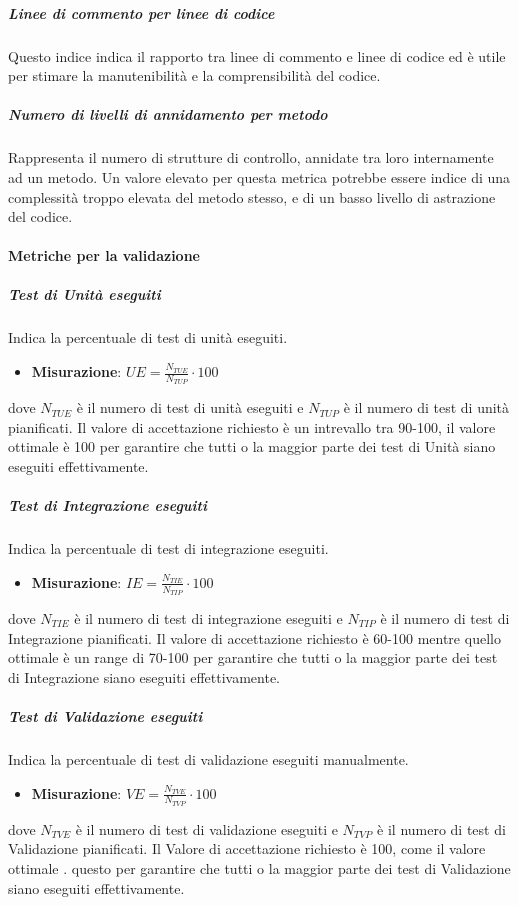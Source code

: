 \subparagraph{Linee di commento per linee di codice}
Questo indice indica il rapporto tra linee di commento e linee di codice ed è utile per stimare la manutenibilità e la comprensibilità del codice. 

\subparagraph{Numero di livelli di annidamento per metodo}
Rappresenta il numero di strutture di controllo, annidate tra loro internamente ad un metodo.
Un valore elevato per questa metrica potrebbe essere indice di una complessità troppo elevata del metodo stesso, e di un basso livello di astrazione del codice.



\paragraph{Metriche per la validazione}


\subparagraph{Test di Unità eseguiti}
Indica la percentuale di test di unità eseguiti.
\begin{itemize}
\item \textbf{Misurazione}: $UE=\frac{N_{TUE}}{N_{TUP}} \cdot 100$
\end{itemize}
dove $N_{TUE}$ è il numero di test di unità eseguiti e $N_{TUP}$ è il numero di test di unità pianificati.
Il valore di accettazione richiesto è un intrevallo tra 90-100, il valore ottimale è 100 per garantire che tutti o la maggior parte dei test di Unità siano eseguiti effettivamente.

\subparagraph{Test di Integrazione eseguiti}
Indica la percentuale di test di integrazione eseguiti. \\
\begin{itemize}
\item \textbf{Misurazione}: $IE=\frac{N_{TIE}}{N_{TIP}} \cdot 100$
\end{itemize}
dove $N_{TIE}$ è il numero di test di integrazione eseguiti e $N_{TIP}$ è il numero di test di Integrazione pianificati.
Il valore di accettazione richiesto è 60-100 mentre quello ottimale è un range di 70-100 per	garantire che tutti o la maggior parte dei test di Integrazione siano eseguiti effettivamente. 

\subparagraph{Test di Validazione eseguiti}
Indica la percentuale di test di validazione eseguiti manualmente.
\begin{itemize}
\item \textbf{Misurazione}: $VE=\frac{N_{TVE}}{N_{TVP}} \cdot 100$
\end{itemize}
dove $N_{TVE}$ è il numero di test di validazione eseguiti e $N_{TVP}$ è il numero di test di Validazione pianificati.
Il Valore di accettazione richiesto è 100, come il valore ottimale . questo per garantire che tutti o la maggior parte dei test di Validazione siano eseguiti effettivamente. 

